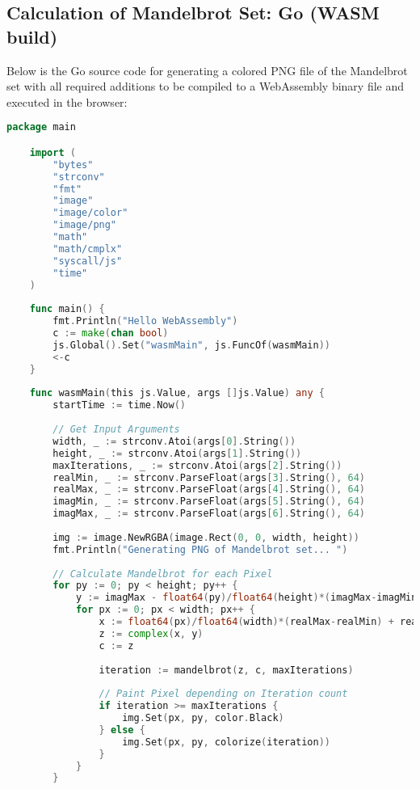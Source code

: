 \subsection{Calculation of Mandelbrot Set: Go (WASM build)}
\label{app:code:mandelbrot2}
Below is the Go source code for generating a colored PNG file of the Mandelbrot set with all required additions to be compiled to a WebAssembly binary file and executed in the browser:

\begin{lstlisting}[language=go, frame=tb, caption={Mandelbrot Set Calculation: Go (WASM build)}]
    package main

    import (
        "bytes"
        "strconv"
        "fmt"
        "image"
        "image/color"
        "image/png"
        "math"
        "math/cmplx"
        "syscall/js"
        "time"
    )
    
    func main() {
        fmt.Println("Hello WebAssembly")
        c := make(chan bool)
        js.Global().Set("wasmMain", js.FuncOf(wasmMain))
        <-c
    }
    
    func wasmMain(this js.Value, args []js.Value) any {
        startTime := time.Now()
    
        // Get Input Arguments
        width, _ := strconv.Atoi(args[0].String())
        height, _ := strconv.Atoi(args[1].String())
        maxIterations, _ := strconv.Atoi(args[2].String())
        realMin, _ := strconv.ParseFloat(args[3].String(), 64)
        realMax, _ := strconv.ParseFloat(args[4].String(), 64)
        imagMin, _ := strconv.ParseFloat(args[5].String(), 64)
        imagMax, _ := strconv.ParseFloat(args[6].String(), 64)
    
        img := image.NewRGBA(image.Rect(0, 0, width, height))
        fmt.Println("Generating PNG of Mandelbrot set... ")
    
        // Calculate Mandelbrot for each Pixel
        for py := 0; py < height; py++ {
            y := imagMax - float64(py)/float64(height)*(imagMax-imagMin)
            for px := 0; px < width; px++ {
                x := float64(px)/float64(width)*(realMax-realMin) + realMin
                z := complex(x, y)
                c := z
    
                iteration := mandelbrot(z, c, maxIterations)
    
                // Paint Pixel depending on Iteration count
                if iteration >= maxIterations {
                    img.Set(px, py, color.Black)
                } else {
                    img.Set(px, py, colorize(iteration))
                }
            }
        }
    

\end{lstlisting}
